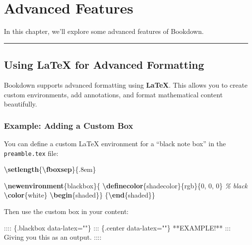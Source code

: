 \documentclass[
]{book}
\newenvironment{Shaded}{\begin{snugshade}}{\end{snugshade}}
\newcommand{\CommentTok}[1]{\textcolor[rgb]{0.56,0.35,0.01}{\textit{#1}}}
\newcommand{\ExtensionTok}[1]{#1}
\newcommand{\FunctionTok}[1]{\textcolor[rgb]{0.13,0.29,0.53}{\textbf{#1}}}
\newcommand{\KeywordTok}[1]{\textcolor[rgb]{0.13,0.29,0.53}{\textbf{#1}}}
\newcommand{\NormalTok}[1]{#1}
\theoremstyle{definition}
\theoremstyle{definition}
\theoremstyle{definition}
\theoremstyle{definition}
\theoremstyle{remark}
\begin{document}
\chapter{Advanced Features}\label{chapter6}

In this chapter, we'll explore some advanced features of Bookdown.

\begin{center}\rule{0.5\linewidth}{0.5pt}\end{center}

\section{Using LaTeX for Advanced Formatting}\label{using-latex-for-advanced-formatting}

Bookdown supports advanced formatting using \textbf{LaTeX}. This allows you to create custom environments, add annotations, and format mathematical content beautifully.

\subsection{Example: Adding a Custom Box}\label{example-adding-a-custom-box}

You can define a custom LaTeX environment for a ``black note box'' in the \texttt{preamble.tex} file:

\begin{Shaded}
\begin{Highlighting}[]
\FunctionTok{\textbackslash{}setlength}\NormalTok{\{}\FunctionTok{\textbackslash{}fboxsep}\NormalTok{\}\{.8em\}}

\FunctionTok{\textbackslash{}newenvironment}\NormalTok{\{blackbox\}\{}
  \FunctionTok{\textbackslash{}definecolor}\NormalTok{\{shadecolor\}\{rgb\}\{0, 0, 0\}  }\CommentTok{\% black}
  \FunctionTok{\textbackslash{}color}\NormalTok{\{white\}}
  \KeywordTok{\textbackslash{}begin}\NormalTok{\{}\ExtensionTok{shaded}\NormalTok{\}\}}
\NormalTok{ \{}\KeywordTok{\textbackslash{}end}\NormalTok{\{}\ExtensionTok{shaded}\NormalTok{\}\}}
\end{Highlighting}
\end{Shaded}

Then use the custom box in your content:

\begin{Shaded}
\begin{Highlighting}[]
\NormalTok{:::: \{.blackbox data{-}latex=""\}}
\NormalTok{::: \{.center data{-}latex=""\}}
\NormalTok{**EXAMPLE!**}
\NormalTok{:::}
\NormalTok{Giving you this as an output.}
\NormalTok{::::}
\end{Highlighting}
\end{Shaded}
\end{document}
